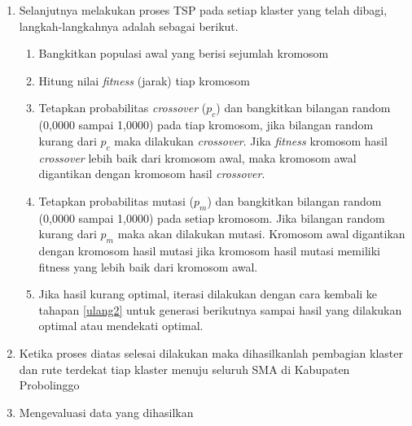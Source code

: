 \begin{enumerate}
	\item Selanjutnya melakukan proses TSP pada setiap klaster yang telah dibagi, langkah-langkahnya adalah sebagai berikut.
	\begin{enumerate}
		\item Bangkitkan populasi awal yang berisi sejumlah kromosom
	    \item \label{ulang2} Hitung nilai \textit{fitness} (jarak) tiap kromosom
	    \item Tetapkan probabilitas \textit{crossover} ($p_c$) dan bangkitkan bilangan random (0,0000 sampai 1,0000) pada tiap kromosom, jika bilangan random kurang dari $p_c$ maka dilakukan \textit{crossover}. Jika \textit{fitness} kromosom hasil \textit{crossover} lebih baik dari kromosom awal, maka kromosom awal digantikan dengan kromosom hasil \textit{crossover}.
	    \item Tetapkan probabilitas mutasi ($p_m$) dan bangkitkan bilangan random (0,0000 sampai 1,0000) pada setiap kromosom. Jika bilangan random kurang dari $p_m$ maka akan dilakukan mutasi. Kromosom awal digantikan dengan kromosom hasil mutasi jika kromosom hasil mutasi memiliki fitness yang lebih baik dari kromosom awal.
	    \item Jika hasil kurang optimal, iterasi dilakukan dengan cara kembali ke tahapan \ref{ulang2} untuk generasi berikutnya sampai hasil yang dilakukan optimal atau mendekati optimal.
    \end{enumerate}
	\item Ketika proses diatas selesai dilakukan maka dihasilkanlah pembagian klaster dan rute terdekat tiap klaster menuju seluruh SMA di Kabupaten Probolinggo
	\item Mengevaluasi data yang dihasilkan
\end{enumerate}
